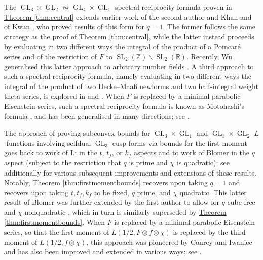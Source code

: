 \documentclass[11pt,a4paper]{amsart}
\newcommand{\R}{\mathbb{R}}
\newcommand{\Z}{\mathbb{Z}}
\DeclareMathOperator{\GL}{GL}
\DeclareMathOperator{\SL}{SL}
\numberwithin{equation}{section}
\theoremstyle{remark}
\theoremstyle{definition}
\begin{document}
The $\GL_3 \times \GL_2 \leftrightsquigarrow \GL_4 \times \GL_1$ spectral reciprocity formula proven in \hyperref[thm:central]{Theorem \ref*{thm:central}} extends earlier work of the second author and Khan \cite[Theorem 3.1]{HK25} and of Kwan \cite[Theorem 1.1]{Kwa24}, who proved results of this form for $q = 1$. The former follows the same strategy as the proof of \hyperref[thm:central]{Theorem \ref*{thm:central}}, while the latter instead proceeds by evaluating in two different ways the integral of the product of a Poincar\'{e} series and of the restriction of $F$ to $\SL_2(\Z) \backslash \SL_2(\R)$. Recently, Wu generalised this latter approach to arbitrary number fields \cite[Theorem 1.1]{Wu23}. A third approach to such a spectral reciprocity formula, namely evaluating in two different ways the integral of the product of two Hecke--Maa\ss{} newforms and two half-integral weight theta series, is explored in \cite{Nel19a} and \cite{Bir25}. When $F$ is replaced by a minimal parabolic Eisenstein series, such a spectral reciprocity formula is known as Motohashi's formula \cite[Theorem 4.2]{Mot97}, and has been generalised in many directions; see \cite{BCF25,BFW21,BHKM20,Fro20,HPY25,Kan22,Kwa23,Nel19b,Wu22,WX23}.

The approach of proving subconvex bounds for $\GL_3 \times \GL_1$ and $\GL_3 \times \GL_2$ $L$-functions involving selfdual $\GL_3$ cusp forms via bounds for the first moment goes back to work of Li \cite{Li11} in the $t$, $t_f$, or $k_f$ aspects and to work of Blomer \cite{Blo12} in the $q$ aspect (subject to the restriction that $q$ is prime and $\chi$ is quadratic); see additionally \cite{Gan23,Hua21,LNQ23,MSY18,Nun17,Qi19,Qi24,SY19} for various subsequent improvements and extensions of these results. Notably, \hyperref[thm:firstmomentbounds]{Theorem \ref*{thm:firstmomentbounds}} recovers \cite[Theorem 1.1]{LNQ23} upon taking $q = 1$ and recovers \cite[Proposition 3]{Blo12} upon taking $t,t_f,k_f$ to be fixed, $q$ prime, and $\chi$ quadratic. This latter result of Blomer was further extended by the first author to allow for $q$ cube-free and $\chi$ nonquadratic \cite[Theorem 2.0.1]{Gan23}, which in turn is similarly superseded by \hyperref[thm:firstmomentbounds]{Theorem \ref*{thm:firstmomentbounds}}. When $F$ is replaced by a minimal parabolic Eisenstein series, so that the first moment of $L(1/2,F \otimes f \otimes \chi)$ is replaced by the third moment of $L(1/2,f \otimes \chi)$, this approach was pioneered by Conrey and Iwaniec \cite{CI00} and has also been improved and extended in various ways; see \cite{BFW21,Fro20,Ivi01,Lu12,Nel19b,Pen01,Pet15,PY19,PY20,PY23,Wu22,WX23,You17}.
\end{document}
